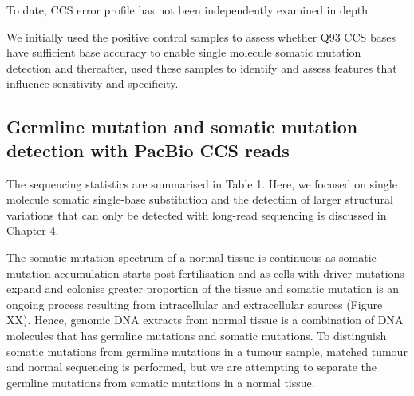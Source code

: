 To date, CCS error profile has not been independently examined in depth  

We initially used the positive control samples to assess whether Q93 CCS bases have sufficient base accuracy to enable single molecule somatic mutation detection and thereafter, used these samples to identify and assess features that influence sensitivity and specificity. 

\subsection{Germline mutation and somatic mutation detection with PacBio CCS reads}

The sequencing statistics are summarised in Table 1. Here, we focused on single molecule somatic single-base substitution and the detection of larger structural variations that can only be detected with long-read sequencing is discussed in Chapter 4.

The somatic mutation spectrum of a normal tissue is continuous as somatic mutation accumulation starts post-fertilisation and as cells with driver mutations expand and colonise greater proportion of the tissue and somatic mutation is an ongoing process resulting from intracellular and extracellular sources (Figure XX). Hence, genomic DNA extracts from normal tissue is a combination of DNA molecules that has germline mutations and somatic mutations. To distinguish somatic mutations from germline mutations in a tumour sample, matched tumour and normal sequencing is performed, but we are attempting to separate the germline mutations from somatic mutations in a normal tissue. 

